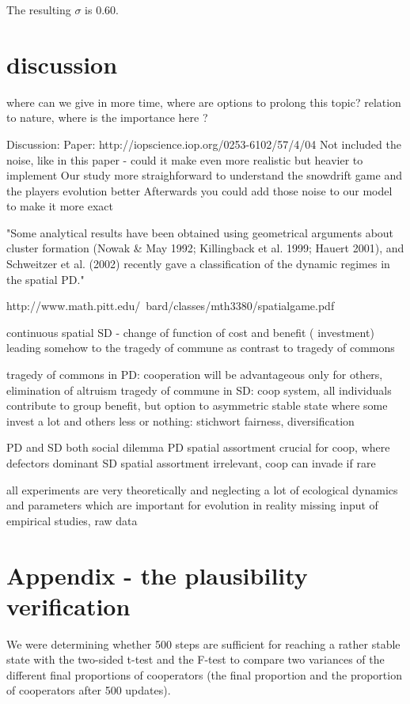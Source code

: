 \documentclass[DIV=calc, paper=a4, fontsize=11pt, twocolumn]{scrartcl}	 %
\begin{document}
The resulting $\sigma$ is $0.60$. 


\section*{discussion}

where can we give in more time, where are options to prolong this topic? relation to nature, where is the importance here ? 

Discussion: 
Paper: http://iopscience.iop.org/0253-6102/57/4/04
Not included the noise, like in this paper  - could it make even more realistic but heavier to implement
Our study more straighforward to understand the snowdrift game and the players evolution better
Afterwards you could add those noise to our model to make it more exact

"Some analytical results have been obtained using geometrical arguments about cluster formation (Nowak \& May 1992; Killingback et al. 1999; Hauert 2001), and Schweitzer et al. (2002) recently gave a classification of the dynamic regimes in the spatial PD."

http://www.math.pitt.edu/~bard/classes/mth3380/spatialgame.pdf

continuous spatial SD - change of function of cost and benefit ( investment) leading somehow to the tragedy of commune as contrast to tragedy of commons 

tragedy of commons in PD: cooperation will be advantageous only for others, elimination of altruism 
tragedy of commune in SD: coop system, all individuals contribute to group benefit, but option to asymmetric stable state where some invest a lot and others less or nothing: stichwort fairness, diversification

PD and SD both social dilemma
PD spatial assortment crucial for coop, where defectors dominant
SD spatial assortment irrelevant, coop can invade if rare

all experiments are very theoretically and neglecting a lot of ecological dynamics and parameters which are important for evolution in reality
missing input of empirical studies, raw data


\section*{Appendix - the plausibility verification}

\noindent We were determining whether 500 steps are sufficient for reaching a rather stable state with the two-sided t-test and the F-test to compare two variances of the different final proportions of cooperators (the final proportion and the proportion of cooperators after 500 updates). 
\end{document}
